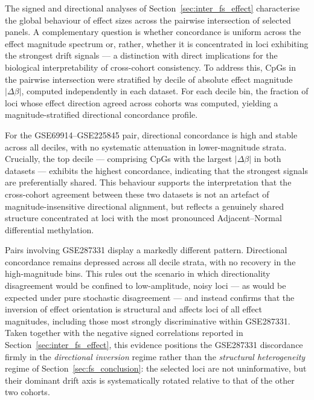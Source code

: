 The signed and directional analyses of Section~\ref{sec:inter_fs_effect}
characterise the global behaviour of effect sizes across the pairwise
intersection of selected panels.
A complementary question is whether concordance is uniform across the
effect magnitude spectrum or, rather, whether it is concentrated in loci
exhibiting the strongest drift signals — a distinction with direct
implications for the biological interpretability of cross-cohort
consistency.
To address this, CpGs in the pairwise intersection were stratified by
decile of absolute effect magnitude $|\Delta\beta|$, computed
independently in each dataset.
For each decile bin, the fraction of loci whose effect direction agreed
across cohorts was computed, yielding a magnitude-stratified directional
concordance profile.

For the GSE69914--GSE225845 pair, directional concordance is high and
stable across all deciles, with no systematic attenuation in lower-magnitude
strata.
Crucially, the top decile — comprising CpGs with the largest
$|\Delta\beta|$ in both datasets — exhibits the highest concordance,
indicating that the strongest signals are preferentially shared.
This behaviour supports the interpretation that the cross-cohort
agreement between these two datasets is not an artefact of
magnitude-insensitive directional alignment, but reflects a genuinely
shared structure concentrated at loci with the most pronounced
Adjacent--Normal differential methylation.

Pairs involving GSE287331 display a markedly different pattern.
Directional concordance remains depressed across all decile strata,
with no recovery in the high-magnitude bins.
This rules out the scenario in which directionality disagreement
would be confined to low-amplitude, noisy loci — as would be
expected under pure stochastic disagreement — and instead confirms
that the inversion of effect orientation is structural and affects
loci of all effect magnitudes, including those most strongly
discriminative within GSE287331.
Taken together with the negative signed correlations reported in
Section~\ref{sec:inter_fs_effect}, this evidence positions the
GSE287331 discordance firmly in the \emph{directional inversion}
regime rather than the \emph{structural heterogeneity} regime
of Section~\ref{sec:fs_conclusion}: the selected loci
are not uninformative, but their dominant drift axis is systematically
rotated relative to that of the other two cohorts.

